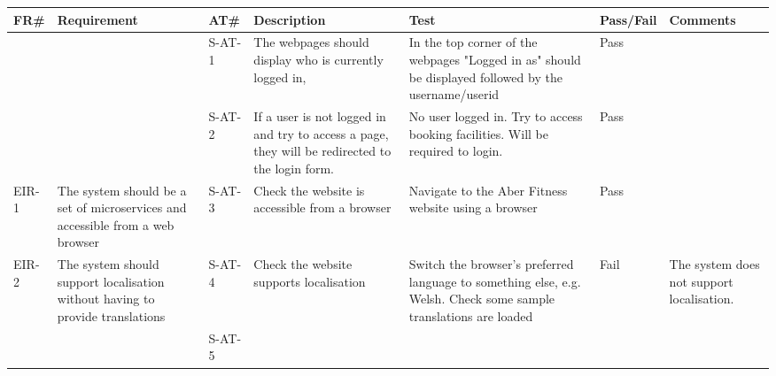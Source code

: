 \begin{longtable}{ |l|p{3cm}|l|p{5cm}|p{5cm}|l|p{6.5cm}|}
\hline
\textbf{FR\#}	&	\textbf{Requirement} & \textbf{AT\#}	&	\textbf{Description} & \textbf{Test} & \textbf{Pass/Fail} &	\textbf{Comments} \\
\hline
\endhead

&  & S-AT-1 & The webpages should display who is currently logged in, & In the top corner of the webpages "Logged in as" should be displayed followed by the username/userid & Pass &  \\ \hline
 &  & S-AT-2 & If a user is not logged in and try to access a page, they will be redirected to the login form. & No user logged in. Try to access booking facilities. Will be required to login. & Pass &  \\ \hline
EIR-1 & The system should be a set of microservices and accessible from a web browser & S-AT-3 & Check the website is accessible from a browser & Navigate to the Aber Fitness website using a browser & Pass &  \\ \hline
EIR-2 & The system should support localisation without having to provide translations & S-AT-4 & Check the website supports localisation & Switch the browser's preferred language to something else, e.g. Welsh. Check some sample translations are loaded & Fail & The system does not support localisation. \\ \hline
 &  & S-AT-5 &  &  &  &  \\ \hline

\end{longtable}